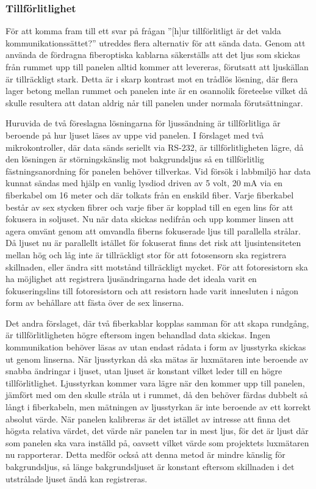 
        \subsubsection{Tillförlitlighet} %
        \label{sub:tillf_rlitlighet}
            För att komma fram till ett svar på frågan ''[h]ur tillförlitligt är det valda kommunikationssättet?'' utreddes flera alternativ för att sända data. Genom att använda de fördragna fiberoptiska kablarna säkerställs att det ljus som skickas från rummet upp till panelen alltid kommer att levereras, förutsatt att ljuskällan är tillräckligt stark. Detta är i skarp kontrast mot en trådlös lösning, där flera lager betong mellan rummet och panelen inte är en osannolik företeelse vilket då skulle resultera att datan aldrig når till panelen under normala förutsättningar. \bigskip

            Huruvida de två föreslagna lösningarna för ljussändning är tillförlitliga är beroende på hur ljuset läses av uppe vid panelen. I förslaget med två mikrokontroller, där data sänds seriellt via RS-232, är tillförlitligheten lägre, då den lösningen är störningskänslig mot bakgrundsljus så en tillförlitlig fästningsanordning för panelen behöver tillverkas. Vid försök i labbmiljö har data kunnat sändas med hjälp en vanlig lysdiod driven av 5 volt, 20 mA via en fiberkabel om 16 meter och där tolkats från en enskild fiber. Varje fiberkabel består av sex stycken fibrer och varje fiber är kopplad till en egen lins för att fokusera in soljuset. Nu när data skickas nedifrån och upp kommer linsen att agera omvänt genom att omvandla fiberns fokuserade ljus till parallella strålar. Då ljuset nu är parallellt istället för fokuserat finns det risk att ljusintensiteten mellan hög och låg inte är tillräckligt stor för att fotosensorn ska registrera skillnaden, eller ändra sitt motstånd tillräckligt mycket. För att fotoresistorn ska ha möjlighet att registrera ljusändringarna hade det ideala varit en fokuseringslins till fotoresistorn och att resistorn hade varit innesluten i någon form av behållare att fästa över de sex linserna. \bigskip

            Det andra förslaget, där två fiberkablar kopplas samman för att skapa rundgång, är tillförlitligheten högre eftersom ingen behandlad data skickas. Ingen kommunikation behöver läsas av utan endast rådata i form av ljusstyrka skickas ut genom linserna. När ljusstyrkan då ska mätas är luxmätaren inte beroende av snabba ändringar i ljuset, utan ljuset är konstant vilket leder till en högre tillförlitlighet. Ljusstyrkan kommer vara lägre när den kommer upp till panelen, jämfört med om den skulle stråla ut i rummet, då den behöver färdas dubbelt så långt i fiberkabeln, men mätningen av ljusstyrkan är inte beroende av ett korrekt absolut värde. När panelen kalibreras är det istället av intresse att finna det högsta relativa värdet, det värde när panelen tar in mest ljus, för det är ljust där som panelen ska vara inställd på, oavsett vilket värde som projektets luxmätaren nu rapporterar. Detta medför också att denna metod är mindre känslig för bakgrundsljus, så länge bakgrundsljuset är konstant eftersom skillnaden i det utstrålade ljuset ändå kan registreras.\bigskip 


